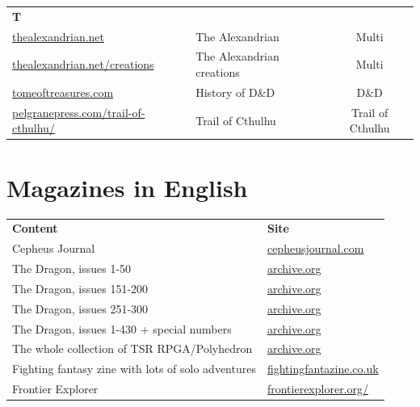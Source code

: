 \documentclass[a4paper, 11pt, twoside]{article}
\begin{document}
\begin{longtable}{llc}
\textbf{T} &  & \\
\href{http://thealexandrian.net/index.html}{thealexandrian.net} & The Alexandrian & Multi\\
\href{http://www.thealexandrian.net/creations/creations.html}{thealexandrian.net/creations} & The Alexandrian creations & Multi\\
\href{http://www.tomeoftreasures.com/tot\_adnd/adnd\_history.htm}{tomeoftreasures.com} & History of D\&D & D\&D\\
\href{http://site.pelgranepress.com/index.php/category/products/trail-of-cthulhu/}{pelgranepress.com/trail-of-cthulhu/} & Trail of Cthulhu & Trail of Cthulhu\\
\end{longtable}

\section{Magazines in English}
\label{sec:org54ce26c}

\begin{longtable}{ll}
\textbf{Content} & \textbf{Site}\\
Cepheus Journal & \href{https://cepheusjournal.com/}{cepheusjournal.com}\\
The Dragon, issues 1-50 & \href{https://archive.org/details/DragonMagazine045\_201903}{archive.org}\\
The Dragon, issues 151-200 & \href{https://archive.org/details/DragonMagazine200\_201903/dragon\%2520151-200/Dragon\%2520Magazine\%2520\%2523151/page/n0/mode/2up}{archive.org}\\
The Dragon, issues 251-300 & \href{https://archive.org/details/DragonMagazine200\_201903/dragon\%2520151-200/Dragon\%2520Magazine\%2520\%2523151/page/n0/mode/2up}{archive.org}\\
The Dragon, issues 1-430 + special numbers & \href{https://archive.org/details/DragonMagazine260\_201801/Dragon\%2520Magazine\%2520430/mode/2up}{archive.org}\\
The whole collection of TSR RPGA/Polyhedron & \href{https://archive.org/details/Polyhedron105}{archive.org}\\
Fighting fantasy zine with lots of solo adventures & \href{http://www.fightingfantazine.co.uk/page/}{fightingfantazine.co.uk}\\
Frontier Explorer & \href{https://frontierexplorer.org/}{frontierexplorer.org/}\\
\end{longtable}
\end{document}

